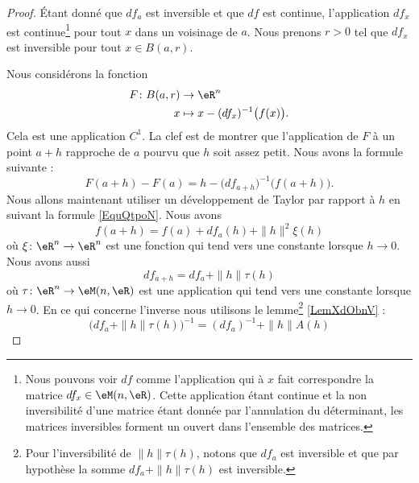 \begin{proof}
    Étant donné que \( df_a\) est inversible et que \( df\) est continue, l'application \( df_x\) est continue\footnote{Nous pouvons voir \( df\) comme l'application qui à \( x\) fait correspondre la matrice \( df_x\in\eM(n,\eR)\). Cette application étant continue et la non inversibilité d'une matrice étant donnée par l'annulation du déterminant, les matrices inversibles forment un ouvert dans l'ensemble des matrices.} pour tout \( x\) dans un voisinage de \( a\). Nous prenons \( r>0\) tel que \( df_x\) est inversible pour tout \( x\in B(a,r)\).

    Nous considérons la fonction 
    \begin{equation}
        \begin{aligned}
                F\colon B(a,r)&\to \eR^n \\
                x&\mapsto x-(df_x)^{-1}\big( f(x) \big). 
            \end{aligned}
        \end{equation}
        Cela est une application \( C^1\). La clef est de montrer que l'application de \( F\) à un point \( a+h\) rapproche de \( a\) pourvu que \( h\) soit assez petit. Nous avons la formule suivante :
        \begin{equation}        \label{EqyDLQeE}
            F(a+h)-F(a)=h-\big( df_{a+h} \big)^{-1}\big( f(a+h) \big).
        \end{equation}
        Nous allons maintenant utiliser un développement de Taylor par rapport à \( h\) en suivant la formule \eqref{EquQtpoN}. Nous avons
        \begin{equation}
            f(a+h)=f(a)+df_a(h)+\| h \|^2\xi(h)
        \end{equation}
        où \( \xi\colon \eR^n\to \eR^n\) est une fonction qui tend vers une constante lorsque \( h\to 0\). Nous avons aussi
        \begin{equation}
            df_{a+h}=df_a+\| h \|\tau(h)
        \end{equation}
        où \( \tau\colon \eR^n\to \eM(n,\eR)\) est une application qui tend vers une constante lorsque \( h\to 0\). En ce qui concerne l'inverse nous utilisons le lemme\footnote{Pour l'inversibilité de \( \| h \|\tau(h)\), notons que \( df_a\) est inversible et que par hypothèse la somme \( df_a+\| h \|\tau(h)\) est inversible.} \ref{LemXdObnV} :
        \begin{equation}
            \big( df_a+\| h \|\tau(h) \big)^{-1}=(df_a)^{-1}+\| h \|A(h)
        \end{equation}

\end{proof}
